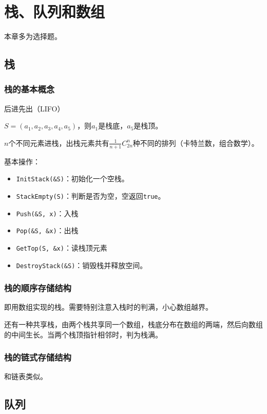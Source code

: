 \documentclass[12pt, a4paper, oneside]{ctexart}
\begin{document}
\section{栈、队列和数组}

本章多为选择题。

\subsection{栈}

\subsubsection{栈的基本概念}

后进先出（LIFO）

$S=(a_1,a_2,a_3,a_4,a_5)$，则$a_1$是栈底，$a_5$是栈顶。

$n$个不同元素进栈，出栈元素共有$\frac{1}{n+1}C_{2n}^n$种不同的排列（卡特兰数，组合数学）。

基本操作：
\begin{itemize}
  \item \verb|InitStack(&S)|：初始化一个空栈。
  \item \verb|StackEmpty(S)|：判断是否为空，空返回\verb|true|。
  \item \verb|Push(&S, x)|：入栈
  \item \verb|Pop(&S, &x)|：出栈
  \item \verb|GetTop(S, &x)|：读栈顶元素
  \item \verb|DestroyStack(&S)|：销毁栈并释放空间。
\end{itemize}

\subsubsection{栈的顺序存储结构}

即用数组实现的栈。需要特别注意入栈时的判满，小心数组越界。

还有一种共享栈，由两个栈共享同一个数组，栈底分布在数组的两端，然后向数组的中间生长。当两个栈顶指针相邻时，判为栈满。

\subsubsection{栈的链式存储结构}

和链表类似。

\subsection{队列}
\end{document}
